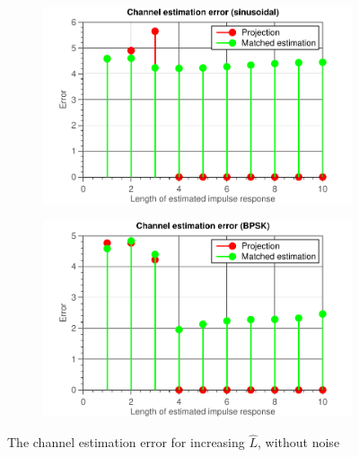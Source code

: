 \documentclass[11pt,titlepage]{report}
\begin{document}
\begin{figure}[H]
\begin{subfigure}{0.49\textwidth}
		\includegraphics[width=\textwidth]{../../deliverable-7-resources/figures/ass-1/report-8-9-10/report-9-no-noise/ass-1-report-9-sinusoidal.pdf}
	\end{subfigure}
	\begin{subfigure}{0.49\textwidth}
		\includegraphics[width=\textwidth]{../../deliverable-7-resources/figures/ass-1/report-8-9-10/report-9-no-noise/ass-1-report-9-BPSK.pdf}
	\end{subfigure}
	\caption{The channel estimation error for increasing $\hat{L}$, without noise}
	\label{fig:rep9-error}
\end{figure}
\end{document}
